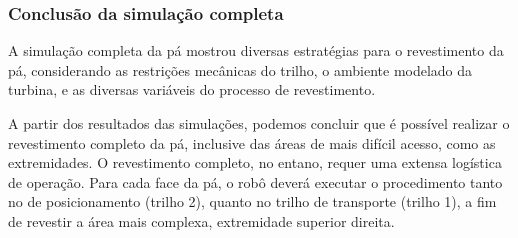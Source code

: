 \subsubsection{Conclusão da simulação completa}

A simulação completa da pá mostrou diversas estratégias para o revestimento da
pá, considerando as restrições mecânicas do trilho, o ambiente modelado da
turbina, e as diversas variáveis do processo de revestimento.

A partir dos resultados das simulações, podemos concluir que é possível realizar
o revestimento completo da pá, inclusive das áreas de mais difícil acesso, como
as extremidades. O revestimento completo, no entano, requer uma extensa
logística de operação. Para cada face da pá, o robô deverá executar o
procedimento tanto no de posicionamento (trilho 2), quanto no trilho de
transporte (trilho 1), a fim de revestir a área mais complexa, extremidade
superior direita. 
